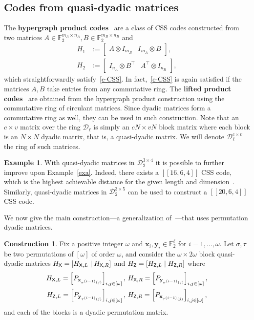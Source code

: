 \documentclass[11pt]{article}
\theoremstyle{plain}
\theoremstyle{plain}
\theoremstyle{definition}
\newtheorem{exa}[theo]{Example}
\newtheorem{construction}[theo]{Construction}
\numberwithin{theo}{section}
\newcommand{\F}{{\mathbb F}}
\newcommand{\cD}{{\mathcal D}}
\newcommand{\bx}{{\mathbf x}}
\newcommand{\by}{{\mathbf y}}
\renewcommand{\o}{\omega}
\def\s{\sigma}
\def\matrix#1{\begin{bmatrix}#1\end{bmatrix}} %
\newcounter{rom}
\newcommand{\sfX}{{\sf X}}
\newcommand{\sfZ}{{\sf Z}}
\begin{document}
\subsection{Codes from quasi-dyadic matrices}

The {\bf hypergraph product codes}~\cite{tillich2013quantum} are a class of CSS codes constructed from two matrices $A\in \F_2^{m_A\times n_A},B\in \F_2^{m_B\times n_B}$ and 
\begin{align*}
H_1 & := \matrix{A\otimes I_{m_B}&I_{m_A}\otimes B},\\
H_2 & := \matrix{I_{n_A}\otimes B^\top&A^\top\otimes I_{n_B}},
\end{align*}
which straightforwardly satisfy~\eqref{e-CSS}. In fact,~\eqref{e-CSS} is again satisfied if the matrices $A,B$ take entries from any commutative ring. The {\bf lifted product codes}~\cite{Panteleev_2022} are obtained from the hypergraph product construction using the commutative ring of circulant matrices. Since dyadic matrices form a commutative ring as well, they can be used in such construction. 
Note that an $c\times v$ matrix over the ring $\cD_\ell$ is simply an $cN\times v N$ block matrix where each block is an $N\times N$ dyadic matrix, that is, a  quasi-dyadic matrix. We will denote $\cD_\ell^{c\times v}$ the ring of such matrices.
\begin{exa}
With quasi-dyadic matrices in $\cD_2^{3\times 4}$ it is possible to further improve upon Example~\ref{exa}. Indeed, there exists a $[\![16,6,4]\!]$ CSS code, which is the highest achievable distance for the given length and dimension~\cite{Grassl:codetables}. Similarly, quasi-dyadic matrices in $\cD_2^{3\times 5}$ can be used to construct a $[\![20,6,4]\!]$ CSS code.
\end{exa}

We now give the main construction---a generalization of~\cite{kasai}---that uses permutation dyadic matrices.
\begin{construction}\label{con-main}
Fix a positive integer $\o$ and $\bx_i,\by_i \in \F_2^\ell$ for $i = 1,\ldots,\o$. 
Let $\s, \tau$ be two permutations of $[\o]$ of order $\o$, and consider the $\o\times 2\o$ block quasi-dyadic matrices $H_\sfX = \left[H_{\sfX, L} \mid H_{\sfX, R}\right]$ and $H_\sfZ = \left[H_{\sfZ, L} \mid H_{\sfZ, R}\right]$ where
\begin{align*}
H_{\sfX, L} = \left[P_{\bx_{\s^{(i-1)}(j)}}\right]_{i,j\in[\o]}, \,\, & H_{\sfX, R} = \left[P_{\by_{\s^{(i-1)}(j)}}\right]_{i,j\in[\o]},\\
H_{\sfZ, L} = \left[P_{\by_{\tau^{(i-1)}(j)}}\right]_{i,j\in[\o]}, \,\, & H_{\sfZ, R} = \left[P_{\bx_{\tau^{(i-1)}(j)}}\right]_{i,j\in[\o]},
\end{align*}
and each of the blocks is a dyadic permutation matrix.
\end{construction}
\end{document}
